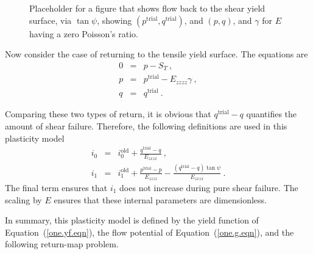 \documentclass[]{scrreprt}
\begin{document}
\begin{figure}[htb]
\begin{center}
\caption{Placeholder for a figure that shows flow back to the shear
  yield surface, via $\tan\psi$, showing $(p^{\mathrm{trial}},
  q^{\mathrm{trial}})$, and $(p, q)$, and $\gamma$ for $E$ having a
  zero Poisson's ratio.}
\label{shear.return.fig}
\end{center}
\end{figure}

Now consider the case of returning to the tensile yield surface.  The
equations are
\begin{eqnarray}
0 & = & p - S_{T} \ , \\
p & = & p^{\mathrm{trial}} - E_{zzzz}\gamma \ , \\
q & = & q^{\mathrm{trial}} \ .
\end{eqnarray}

Comparing these two types of return, it is obvious that
$q^{\mathrm{trial}} - q$ quantifies the amount of shear failure.
Therefore, the following definitions are used in this plasticity model
\begin{eqnarray}
i_{0} & = & i_{0}^{\mathrm{old}} + \frac{q^{\mathrm{trial}} -
  q}{E_{zxzx}} \ , \\
i_{1} & = & i_{1}^{\mathrm{old}} + \frac{p^{\mathrm{trial}} -
  p}{E_{zzzz}} - \frac{(q^{\mathrm{trial}} - q)\tan\psi}{E_{zxzx}} \ .
\end{eqnarray}
The final term ensures that $i_{1}$ does not increase during pure
shear failure.  The scaling by $E$ ensures that these internal
parameters are dimensionless.

In summary, this plasticity model is defined by the yield function of
Equation~(\ref{one.yf.eqn}), the flow potential of
Equation~(\ref{one.g.eqn}), and the following return-map problem.
\end{document}
